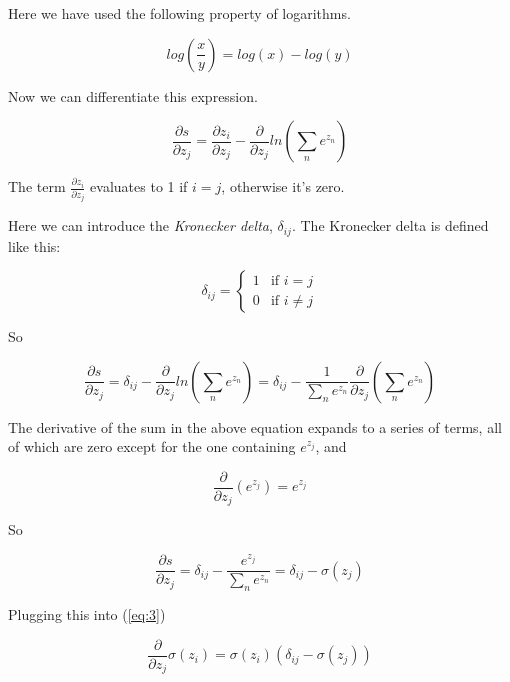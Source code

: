 \documentclass[12pt]{article}
\begin{document}
Here we have used the following property of logarithms.

$$
        log\left(\frac{x}{y}\right) = log(x) - log(y)
$$
\bigskip

Now we can differentiate this expression.

$$
\frac{\partial s}{\partial z_j}=
\frac{\partial z_i}{\partial z_j} - \frac{\partial}{\partial z_j} ln(\sum_n e^{z_n})       
$$
\bigskip

The term $\frac{\partial z_i}{\partial z_j}$ evaluates to 1 if $i = j$, otherwise it's zero.
\bigskip

Here we can introduce the \textit{Kronecker delta}, $\delta_{ij}$.
The Kronecker delta is defined like this:

$$
        \delta_{ij} = 
        \begin{cases}
        1 &\mbox{if } i = j \\
        0 & \mbox{if } i \neq j
        \end{cases}
$$

So

$$
\frac{\partial s}{\partial z_j}
=\delta_{ij} - \frac{\partial}{\partial z_j}ln(  \sum_n e^{z_n})
=\delta_{ij} - \frac{1}{\sum_n e^{z_n}} \frac{\partial}{\partial z_j}(\sum_n e^{z_n})
$$
\bigskip

The derivative of the sum in the above equation expands to a series of terms, all of which are zero except for the one containing $e^{z_j}$, and

$$
        \frac{\partial}{\partial z_j}(e^{z_j})=e^{z_j}
$$ 

So

$$
        \frac{\partial s}{\partial z_j}=
        \delta_{ij} - \frac{e^{z_j}}{\sum_n e^{z_n}}
        =\delta_{ij} - \sigma(z_j)
$$

\bigskip

Plugging this into (\ref{eq:3})

\begin{equation} \label{eq:13}
        \frac{\partial}{\partial z_j}\sigma(z_i)=\sigma(z_i)(\delta_{ij} - \sigma(z_j))
\end{equation}




\end{document}
